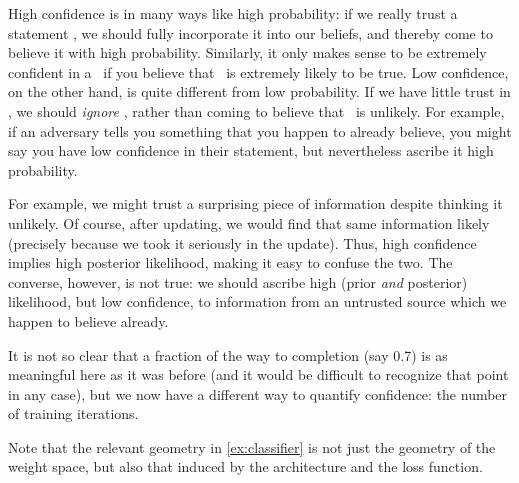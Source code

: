 
High confidence is in many ways like high probability: if we really trust a statement \stmt, we should fully incorporate it into our beliefs, and thereby come to believe it with high probability.
Similarly, it only makes sense to be extremely confident in a \stmt\ if you believe that \stmt\ is extremely likely to be true.
Low confidence, on the other hand, is quite different from low probability.
If we have little trust in \stmt, we should \emph{ignore} \stmt, rather than coming to believe that \stmt\ is unlikely.
For example, if an adversary tells you something that you happen to already believe,
you might say you have low confidence in their statement, but nevertheless ascribe it high probability.



For example, we might trust a surprising piece of information despite thinking it unlikely.
Of course, after updating, we would find that same information likely (precisely because we took it seriously in the update).
Thus, high confidence implies high posterior likelihood, making it easy to confuse the two.
The converse, however, is not true:
we should ascribe high (prior \emph{and} posterior) likelihood, but low confidence, to information from an untrusted source which we happen to believe already.


It is not so clear that a fraction of the way to completion (say 0.7) is as meaningful here as it was before (and it would be difficult to recognize that point in any case),
but we now have a different way to quantify confidence: the number of training iterations. 


Note that the relevant geometry in \cref{ex:classifier} is not just the geometry of the weight space, but also that induced by the architecture and the loss function.



